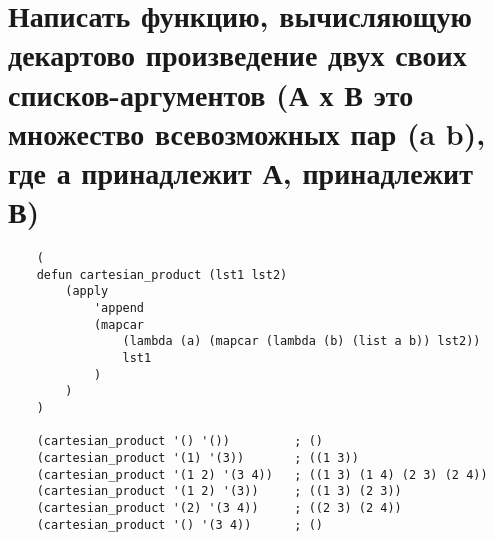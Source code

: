 \section{Написать функцию, вычисляющую декартово произведение двух своих списков-аргументов (А х В это множество всевозможных пар (a b), где а принадлежит А, принадлежит В)}

\begin{lstlisting}
    (
    defun cartesian_product (lst1 lst2)
        (apply
            'append
            (mapcar 
                (lambda (a) (mapcar (lambda (b) (list a b)) lst2)) 
                lst1
            )
        )
    )
    
    (cartesian_product '() '())         ; ()
    (cartesian_product '(1) '(3))       ; ((1 3)) 
    (cartesian_product '(1 2) '(3 4))   ; ((1 3) (1 4) (2 3) (2 4)) 
    (cartesian_product '(1 2) '(3))     ; ((1 3) (2 3)) 
    (cartesian_product '(2) '(3 4))     ; ((2 3) (2 4))  
    (cartesian_product '() '(3 4))      ; ()
\end{lstlisting}


